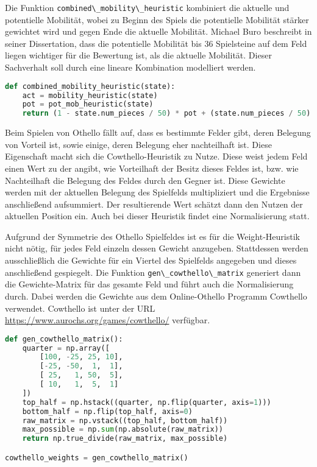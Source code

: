 Die Funktion \passthrough{\lstinline!combined\_mobility\_heuristic!}
kombiniert die aktuelle und potentielle Mobilität, wobei zu Beginn des
Spiels die potentielle Mobilität stärker gewichtet wird und gegen Ende
die aktuelle Mobilität. Michael Buro beschreibt in seiner Dissertation,
dass die potentielle Mobilität bis 36 Spielsteine auf dem Feld liegen
wichtiger für die Bewertung ist, als die aktuelle Mobilität. Dieser
Sachverhalt soll durch eine lineare Kombination modelliert werden.

\begin{lstlisting}[language=Python]
def combined_mobility_heuristic(state):
    act = mobility_heuristic(state)
    pot = pot_mob_heuristic(state)
    return (1 - state.num_pieces / 50) * pot + (state.num_pieces / 50) *  act
\end{lstlisting}

Beim Spielen von Othello fällt auf, dass es bestimmte Felder gibt, deren
Belegung von Vorteil ist, sowie einige, deren Belegung eher nachteilhaft
ist. Diese Eigenschaft macht sich die Cowthello-Heuristik zu Nutze.
Diese weist jedem Feld einen Wert zu der angibt, wie Vorteilhaft der
Besitz dieses Feldes ist, bzw. wie Nachteilhaft die Belegung des Feldes
durch den Gegner ist. Diese Gewichte werden mit der aktuellen Belegung
des Spielfelds multipliziert und die Ergebnisse anschließend
aufsummiert. Der resultierende Wert schätzt dann den Nutzen der
aktuellen Position ein. Auch bei dieser Heuristik findet eine
Normalisierung statt.

Aufgrund der Symmetrie des Othello Spielfeldes ist es für die
Weight-Heuristik nicht nötig, für jedes Feld einzeln dessen Gewicht
anzugeben. Stattdessen werden ausschließlich die Gewichte für ein
Viertel des Spielfelds angegeben und dieses anschließend gespiegelt. Die
Funktion \passthrough{\lstinline!gen\_cowthello\_matrix!} generiert dann
die Gewichte-Matrix für das gesamte Feld und führt auch die
Normalisierung durch. Dabei werden die Gewichte aus dem Online-Othello
Programm Cowthello verwendet. Cowthello ist unter der URL
\url{https://www.aurochs.org/games/cowthello/} verfügbar.

\begin{lstlisting}[language=Python]
def gen_cowthello_matrix():
    quarter = np.array([
        [100, -25, 25, 10],
        [-25, -50,  1,  1],
        [ 25,   1, 50,  5],
        [ 10,   1,  5,  1]
    ])
    top_half = np.hstack((quarter, np.flip(quarter, axis=1)))
    bottom_half = np.flip(top_half, axis=0)
    raw_matrix = np.vstack((top_half, bottom_half))
    max_possible = np.sum(np.absolute(raw_matrix))
    return np.true_divide(raw_matrix, max_possible)

cowthello_weights = gen_cowthello_matrix()
\end{lstlisting}

